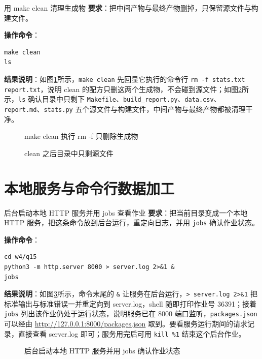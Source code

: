\begin{exercise}{用 make clean 清理生成物}
\textbf{要求}：把中间产物与最终产物删掉，只保留源文件与构建文件。

\textbf{操作命令}：
\begin{lstlisting}
make clean
ls
\end{lstlisting}

\textbf{结果说明}：如图\ref{fig:ms4-07a}所示，\verb|make clean| 先回显它执行的命令行 \texttt{rm -f stats.txt report.txt}，说明 clean 的配方只删这两个生成物，不会碰到源文件；如图\ref{fig:ms4-07b}所示，\verb|ls| 确认目录中只剩下 \verb|Makefile|、\verb|build_report.py|、\verb|data.csv|、\verb|report.md|、\verb|stats.py| 五个源文件与构建文件，中间产物与最终产物都被清理干净。

\begin{figure}[H]
    \centering
    \caption{make clean 执行 rm -f 只删除生成物}
    \label{fig:ms4-07a}
\end{figure}

\begin{figure}[H]
    \centering
    \caption{clean 之后目录中只剩源文件}
    \label{fig:ms4-07b}
\end{figure}
\end{exercise}

\section{本地服务与命令行数据加工}

\begin{exercise}{后台启动本地 HTTP 服务并用 jobs 查看作业}
\textbf{要求}：把当前目录变成一个本地 HTTP 服务，把这条命令放到后台运行，重定向日志，并用 \verb|jobs| 确认作业状态。

\textbf{操作命令}：
\begin{lstlisting}
cd w4/q15
python3 -m http.server 8000 > server.log 2>&1 &
jobs
\end{lstlisting}

\textbf{结果说明}：如图\ref{fig:ms4-08}所示，命令末尾的 \verb|&| 让服务在后台运行，\verb|> server.log 2>&1| 把标准输出与标准错误一并重定向到 server.log，shell 随即打印作业号 36391；接着 \verb|jobs| 列出该作业仍处于运行状态，说明服务已在 8000 端口监听，\verb|packages.json| 可以经由 \url{http://127.0.0.1:8000/packages.json} 取到。要看服务运行期间的请求记录，直接查看 server.log 即可；服务用完后可用 \verb|kill %1| 结束这个后台作业。

\begin{figure}[H]
    \centering
    \caption{后台启动本地 HTTP 服务并用 jobs 确认作业状态}
    \label{fig:ms4-08}
\end{figure}
\end{exercise}

